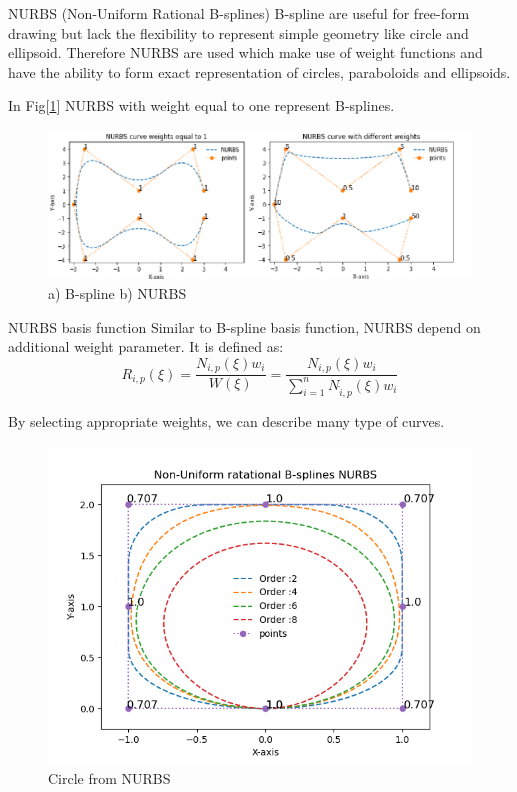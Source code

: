 \documentclass[a4paper,12pt,times]{article}
\begin{document}
\begin{section}{NURBS (Non-Uniform Rational B-splines) }
B-spline are useful for free-form drawing but lack the flexibility to represent simple geometry like circle and ellipsoid. Therefore NURBS are used which make use of weight functions and have the ability to form exact representation of circles, paraboloids and ellipsoids.

In Fig[\ref{fig:NURBS and B-splines representation and differance}] NURBS with weight equal to one represent B-splines. 

\begin{figure}[h!]
\centering
\includegraphics[width=\linewidth]{NURBS_combined_bspline.png}
\caption{a) B-spline b) NURBS}
\label{fig:NURBS and B-splines representation and differance}
\end{figure}

\begin{subsection}{NURBS basis function}
Similar to B-spline basis function, NURBS depend on additional weight parameter.
It is defined as:
\begin{equation}\label{NURBS basis function}
R_{i, p}(\xi)=\frac{N_{i, p}(\xi) w_{i}}{W(\xi)}=\frac{N_{i, p}(\xi) w_{i}}{\sum_{i=1}^{n} N_{\hat{i}, p}(\xi) w_{i}}
\end{equation}

By selecting appropriate weights, we can describe many type of curves.  

\begin{figure}[h!]
\centering
\includegraphics[width=0.85\linewidth]{NURBS_circle.png}
\caption{Circle from NURBS}
\label{fig:NURBS circle for different degree}
\end{figure}


\end{subsection}
\end{section}
\end{document}
